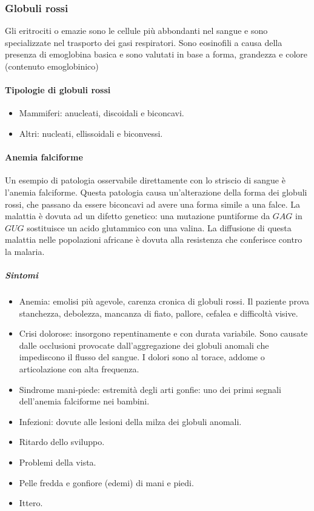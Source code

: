 		\subsubsection{Globuli rossi}
		Gli eritrociti o emazie sono le cellule pi\`u abbondanti nel sangue e sono specializzate nel trasporto dei gasi respiratori.
		Sono eosinofili a causa della presenza di emoglobina basica e sono valutati in base a forma, grandezza e colore (contenuto emoglobinico)
			
			\paragraph{Tipologie di globuli rossi}
		\begin{multicols}{2}
			\begin{itemize}
				\item Mammiferi: anucleati, discoidali e biconcavi.
				\item Altri: nucleati, ellissoidali e biconvessi.
			\end{itemize}
		\end{multicols}
			
			\paragraph{Anemia falciforme}
			Un esempio di patologia osservabile direttamente con lo striscio di sangue \`e l'anemia falciforme. 
			Questa patologia causa un'alterazione della forma dei globuli rossi, che passano da essere biconcavi ad avere una forma simile a una falce. 
			La malattia \`e dovuta ad un difetto genetico: una mutazione puntiforme da $GAG$ in $GUG$ sostituisce un acido glutammico con una valina. 
			La diffusione di questa malattia nelle popolazioni africane \`e dovuta alla resistenza che conferisce contro la malaria.
				
				\subparagraph{Sintomi}
		\begin{multicols}{2}
				\begin{itemize}
					\item Anemia: emolisi pi\`u agevole, carenza cronica di globuli rossi. 
						Il paziente prova stanchezza, debolezza, mancanza di fiato, pallore, cefalea e difficolt\`a visive.
					\item Crisi dolorose: insorgono repentinamente e con durata variabile.
						Sono causate dalle occlusioni provocate dall'aggregazione dei globuli anomali che impediscono il flusso del sangue.
						I dolori sono al torace, addome o articolazione con alta frequenza.
					\item Sindrome mani-piede: estremit\`a degli arti gonfie: uno dei primi segnali dell'anemia falciforme nei bambini.
					\item Infezioni: dovute alle lesioni della milza dei globuli anomali.
					\item Ritardo dello sviluppo.
					\item Problemi della vista.
					\item Pelle fredda e gonfiore (edemi) di mani e piedi.
					\item Ittero.
				\end{itemize}
			\end{multicols}

